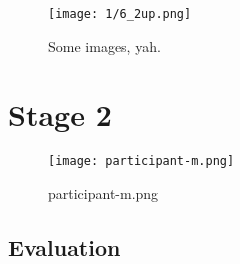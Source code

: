 \clearpage

\begin{figure}[h]
	\begin{center}
	\texttt{[image: 1/6\_2up.png]}
	\caption{Some images, yah.}
	\end{center}
\end{figure}























\clearpage

\section{Stage 2}

\begin{figure}[h]
	\begin{center}
		\texttt{[image: participant-m.png]}
		\caption{participant-m.png}
		\label{participant-m.png}
	\end{center}
\end{figure}

\subsection{Evaluation}

